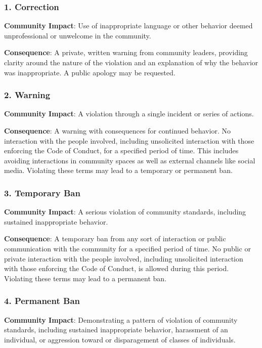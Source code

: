 \subsubsection{1. Correction}\label{correction}

\textbf{Community Impact}: Use of inappropriate language or other
behavior deemed unprofessional or unwelcome in the community.

\textbf{Consequence}: A private, written warning from community leaders,
providing clarity around the nature of the violation and an explanation
of why the behavior was inappropriate. A public apology may be
requested.

\subsubsection{2. Warning}\label{warning}

\textbf{Community Impact}: A violation through a single incident or
series of actions.

\textbf{Consequence}: A warning with consequences for continued
behavior. No interaction with the people involved, including unsolicited
interaction with those enforcing the Code of Conduct, for a specified
period of time. This includes avoiding interactions in community spaces
as well as external channels like social media. Violating these terms
may lead to a temporary or permanent ban.

\subsubsection{3. Temporary Ban}\label{temporary-ban}

\textbf{Community Impact}: A serious violation of community standards,
including sustained inappropriate behavior.

\textbf{Consequence}: A temporary ban from any sort of interaction or
public communication with the community for a specified period of time.
No public or private interaction with the people involved, including
unsolicited interaction with those enforcing the Code of Conduct, is
allowed during this period. Violating these terms may lead to a
permanent ban.

\subsubsection{4. Permanent Ban}\label{permanent-ban}

\textbf{Community Impact}: Demonstrating a pattern of violation of
community standards, including sustained inappropriate behavior,
harassment of an individual, or aggression toward or disparagement of
classes of individuals.

